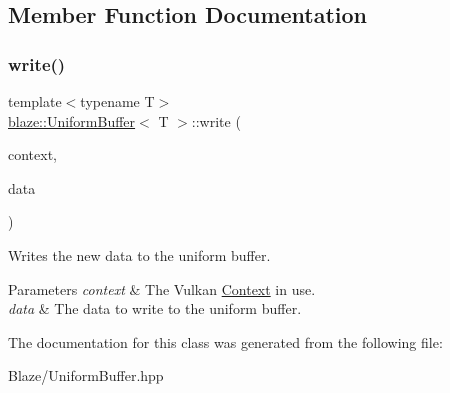 \subsection{Member Function Documentation}
\mbox{\label{classblaze_1_1UniformBuffer_a36699598a9fae6985328009a02af8de5}} 
\subsubsection{\texorpdfstring{write()}{write()}}
{\footnotesize\ttfamily template$<$typename T$>$ \\
\hyperlink{classblaze_1_1UniformBuffer}{blaze\+::\+Uniform\+Buffer}$<$ T $>$\+::write (\begin{DoxyParamCaption}\item[{const \hyperlink{classblaze_1_1Context}{Context} \&}]{context,  }\item[{const T \&}]{data }\end{DoxyParamCaption})\hspace{0.3cm}{\ttfamily [inline]}}



Writes the new data to the uniform buffer. 


\begin{DoxyParams}{Parameters}
{\em context} & The Vulkan \hyperlink{classblaze_1_1Context}{Context} in use. \\
\hline
{\em data} & The data to write to the uniform buffer. \\
\hline
\end{DoxyParams}


The documentation for this class was generated from the following file\+:\begin{DoxyCompactItemize}
\item 
Blaze/Uniform\+Buffer.\+hpp\end{DoxyCompactItemize}
